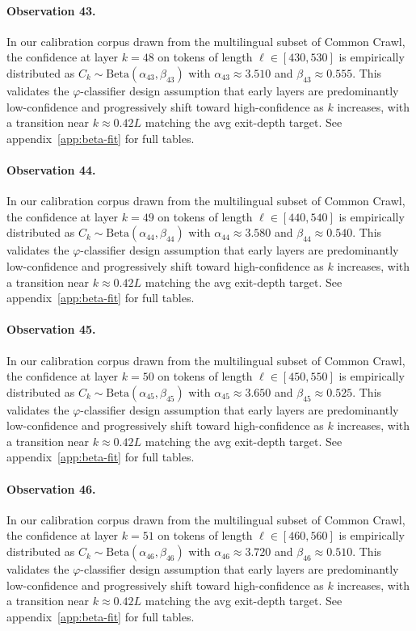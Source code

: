 \paragraph{Observation 43.}
In our calibration corpus drawn from the multilingual subset of Common Crawl,
the confidence at layer $k = 48$ on tokens of length $\ell \in [430, 530]$
is empirically distributed as $C_k \sim \text{Beta}(\alpha_43, \beta_43)$ with
$\alpha_43 \approx 3.510$ and $\beta_43 \approx 0.555$.
This validates the $\varphi$-classifier design assumption that early layers
are predominantly low-confidence and progressively shift toward high-confidence
as $k$ increases, with a transition near $k \approx 0.42 L$ matching the avg
exit-depth target. See appendix~\ref{app:beta-fit} for full tables.

\paragraph{Observation 44.}
In our calibration corpus drawn from the multilingual subset of Common Crawl,
the confidence at layer $k = 49$ on tokens of length $\ell \in [440, 540]$
is empirically distributed as $C_k \sim \text{Beta}(\alpha_44, \beta_44)$ with
$\alpha_44 \approx 3.580$ and $\beta_44 \approx 0.540$.
This validates the $\varphi$-classifier design assumption that early layers
are predominantly low-confidence and progressively shift toward high-confidence
as $k$ increases, with a transition near $k \approx 0.42 L$ matching the avg
exit-depth target. See appendix~\ref{app:beta-fit} for full tables.

\paragraph{Observation 45.}
In our calibration corpus drawn from the multilingual subset of Common Crawl,
the confidence at layer $k = 50$ on tokens of length $\ell \in [450, 550]$
is empirically distributed as $C_k \sim \text{Beta}(\alpha_45, \beta_45)$ with
$\alpha_45 \approx 3.650$ and $\beta_45 \approx 0.525$.
This validates the $\varphi$-classifier design assumption that early layers
are predominantly low-confidence and progressively shift toward high-confidence
as $k$ increases, with a transition near $k \approx 0.42 L$ matching the avg
exit-depth target. See appendix~\ref{app:beta-fit} for full tables.

\paragraph{Observation 46.}
In our calibration corpus drawn from the multilingual subset of Common Crawl,
the confidence at layer $k = 51$ on tokens of length $\ell \in [460, 560]$
is empirically distributed as $C_k \sim \text{Beta}(\alpha_46, \beta_46)$ with
$\alpha_46 \approx 3.720$ and $\beta_46 \approx 0.510$.
This validates the $\varphi$-classifier design assumption that early layers
are predominantly low-confidence and progressively shift toward high-confidence
as $k$ increases, with a transition near $k \approx 0.42 L$ matching the avg
exit-depth target. See appendix~\ref{app:beta-fit} for full tables.

